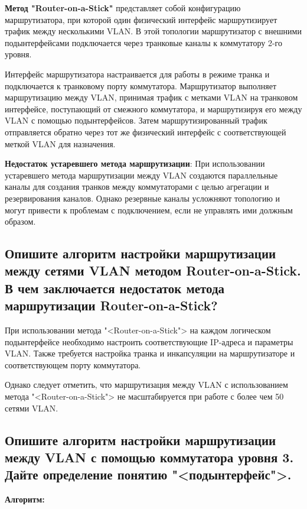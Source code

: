 \textbf{Метод "Router-on-a-Stick"} представляет собой конфигурацию
маршрутизатора, при которой один физический интерфейс маршрутизирует
трафик между несколькими VLAN. В этой топологии маршрутизатор
с внешними подынтерфейсами подключается через транковые каналы
к коммутатору 2-го уровня.\par
Интерфейс маршрутизатора настраивается для работы в режиме транка
и подключается к транковому порту коммутатора.
Маршрутизатор выполняет маршрутизацию между VLAN,
принимая трафик с метками VLAN на транковом интерфейсе,
поступающий от смежного коммутатора, и маршрутизируя его между VLAN
с помощью подынтерфейсов.
Затем маршрутизированный трафик отправляется обратно через
тот же физический интерфейс с соответствующей меткой VLAN для назначения.

\textbf{Недостаток устаревшего метода маршрутизации}: При использовании
устаревшего метода маршрутизации между VLAN создаются параллельные каналы
для создания транков между коммутаторами с целью агрегации
и резервирования каналов. Однако резервные каналы усложняют топологию
и могут привести к проблемам с подключением,
если не управлять ими должным образом.

\subsection{Опишите алгоритм настройки маршрутизации между сетями VLAN 
	методом Router-on-a-Stick. В чем заключается недостаток метода 
	маршрутизации Router-on-a-Stick?}

При использовании метода "<Router-on-a-Stick"> на каждом логическом
подынтерфейсе необходимо настроить соответствующие IP-адреса
и параметры VLAN. Также требуется настройка транка
и инкапсуляции на маршрутизаторе и соответствующем порту коммутатора.\par
Однако следует отметить, что маршрутизация между VLAN
с использованием метода "<Router-on-a-Stick"> не масштабируется при работе
с более чем 50 сетями VLAN.

\subsection{Опишите алгоритм настройки маршрутизации между VLAN с 
	помощью коммутатора уровня 3. Дайте определение понятию 
	"<подынтерфейс">.}

\textbf{Алгоритм:}

